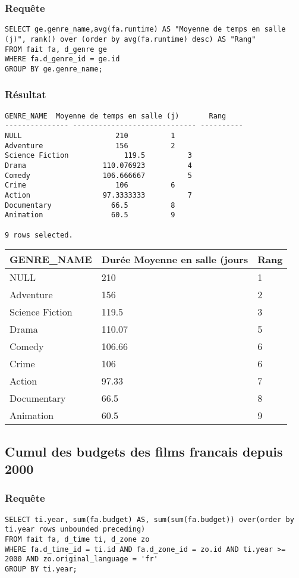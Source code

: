 \subsubsection{Requête}
\begin{lstlisting}
SELECT ge.genre_name,avg(fa.runtime) AS "Moyenne de temps en salle (j)", rank() over (order by avg(fa.runtime) desc) AS "Rang"
FROM fait fa, d_genre ge
WHERE fa.d_genre_id = ge.id
GROUP BY ge.genre_name;
\end{lstlisting}
\subsubsection{Résultat}
\begin{lstlisting}
GENRE_NAME	Moyenne de temps en salle (j)	    Rang
--------------- ----------------------------- ----------
NULL					  210	       1
Adventure				  156	       2
Science Fiction 			119.5	       3
Drama				   110.076923	       4
Comedy				   106.666667	       5
Crime					  106	       6
Action				   97.3333333	       7
Documentary				 66.5	       8
Animation				 60.5	       9

9 rows selected.
\end{lstlisting}

\begin{table}[H]
	\centering
	\begin{tabular}{| l | l | l |}
		\hline
		GENRE\_NAME     & Durée Moyenne en salle (jours & Rang \\
		\hline
		NULL            & 210                           & 1  \\
		Adventure       & 156                           & 2 \\
		Science Fiction & 119.5                         & 3  \\
		Drama & 110.07 & 5 \\
		Comedy & 106.66 & 6 \\
		Crime & 106 & 6 \\
		Action & 97.33 & 7 \\
		Documentary & 66.5 & 8 \\
		Animation & 60.5 & 9 \\ 
		\hline
	\end{tabular}
\end{table}

\subsection{Cumul des budgets des films francais depuis 2000}
\subsubsection{Requête}
\begin{lstlisting}
SELECT ti.year, sum(fa.budget) AS, sum(sum(fa.budget)) over(order by ti.year rows unbounded preceding)
FROM fait fa, d_time ti, d_zone zo
WHERE fa.d_time_id = ti.id AND fa.d_zone_id = zo.id AND ti.year >= 2000 AND zo.original_language = 'fr'
GROUP BY ti.year;
\end{lstlisting}
